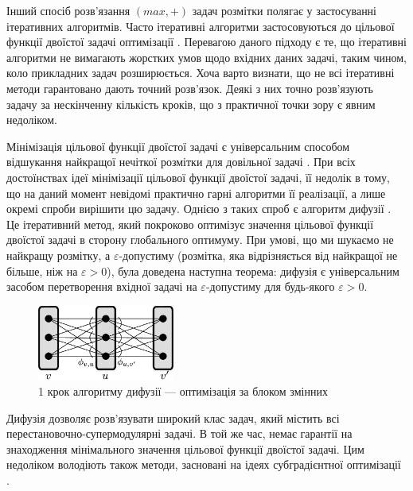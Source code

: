 Інший спосіб розв'язання \((max,+)\) задач розмітки полягає у застосуванні
ітеративних алгоритмів. Часто ітеративні алгоритми застосовуються до цільової функції 
двоїстої задачі оптимізації \cite{SchlGig_1_usim2007,diffusion_shlezinger}. Перевагою даного підходу є те, що ітеративні алгоритми
не вимагають жорстких умов щодо вхідних даних задачі, таким чином, 
коло прикладних задач розширюється. Хоча варто визнати, що не всі ітеративні 
методи гарантовано дають точний розв'язок. Деякі з них точно розв'язують
задачу за нескінченну кількість кроків, що з практичної точки зору є 
явним недоліком.

Мінімізація цільової функції двоїстої задачі є універсальним способом відшукання найкращої
нечіткої розмітки для довільної задачі \cite{diffusion_shlezinger,savchynskyy,SchlGig_1_usim2007}. При всіх достоїнствах ідеї мінімізації
цільової функції двоїстої задачі, її недолік в тому, що на даний момент невідомі практично
гарні алгоритми її реалізації, а лише окремі спроби вирішити цю задачу.
Однією з таких спроб є алгоритм дифузії \cite{diffusion_shlezinger, savchynskyy}. Це ітеративний метод, який покроково
оптимізує значення цільової функції двоїстої задачі в сторону глобального оптимуму. При умові, що ми шукаємо не найкращу
розмітку, а $\varepsilon$-допустиму (розмітка, яка відрізняється від найкращої
не більше, ніж на $\varepsilon>0$), була доведена наступна теорема:
дифузія є універсальним засобом перетворення вхідної задачі на $\varepsilon$-допустиму
для будь-якого $\varepsilon>0$.

\begin{figure}[h]
  \centering
  \includegraphics[width=0.4\textwidth]{images/One-elementary-step-of_diffusion.png}
  \caption{1 крок алгоритму дифузії --- оптимізація за блоком змінних}
  \label{fig:graph_example}
\end{figure}

Дифузія дозволяє розв'язувати широкий клас задач, який містить всі
перестановочно-супермодулярні задачі. В той же час, немає гарантії на знаходження мінімального 
значення цільової функції двоїстої задачі. Цим недоліком володіють також 
методи, засновані на ідеях субградієнтної оптимізації \cite{Shor1985}.

